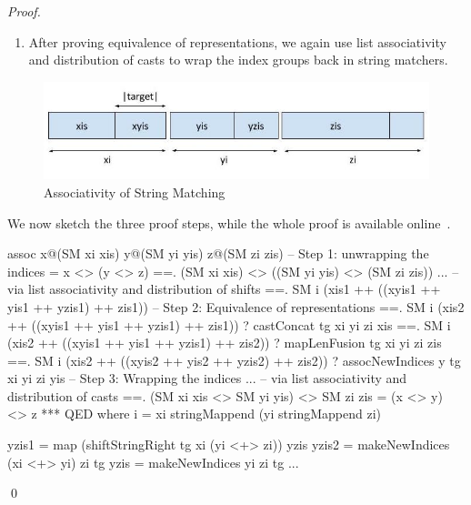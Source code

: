 \begin{proof}
\begin{enumerate}
\begin{code}
zis2 = map (shiftStringRight tg (xi stringMappend yi) zi) zis
\end{code}
That is, in right first, the indices of @z@ are first shifted
by the length of @yi@ and then by the length of @xi@,
while in the left first case, the indices of @z@ are shifted by the
length of @xi stringMappend yi@.
In this second step of the proof we prove, using lemmata,
the equivalence of the different group representations.
%
The most interesting lemma we use is called @assocNewIndices@ and proves
equivalence of all the three middle groups together
by case analysis on the relative lengths of the target @tg@ and the middle string @yi@.
\item After proving equivalence of representations,
we again use list associativity and distribution of casts to wrap the
index groups back in string matchers.
\end{enumerate}
\begin{figure}
\includegraphics[scale=0.5]{AssociativeIndices}
\caption{Associativity of String Matching}
\label{fig:mappend:assoc}
\end{figure}
We now sketch the three proof steps, while the whole proof
is available online~\cite{implementation}.
\begin{code}
assoc x@(SM xi xis) y@(SM yi yis) z@(SM zi zis)
  -- Step 1: unwrapping the indices
  =   x <> (y <> z)
  ==. (SM xi xis) <> ((SM yi yis) <> (SM zi zis))
                         ...
  -- via list associativity and distribution of shifts
  ==. SM i (xis1 ++ ((xyis1 ++ yis1 ++ yzis1) ++ zis1))
  -- Step 2: Equivalence of representations
  ==. SM i (xis2 ++ ((xyis1 ++ yis1 ++ yzis1) ++ zis1))
      ? castConcat tg xi yi zi xis
  ==. SM i (xis2 ++ ((xyis1 ++ yis1 ++ yzis1) ++ zis2))
      ? mapLenFusion tg xi yi zi zis
  ==. SM i (xis2 ++ ((xyis2 ++ yis2 ++ yzis2) ++ zis2))
      ? assocNewIndices y tg xi yi zi yis
  -- Step 3: Wrapping the indices
                         ...
  -- via list associativity and distribution of casts
  ==. (SM xi xis <> SM yi yis) <> SM zi zis
  =   (x <> y) <> z
  *** QED
  where
    i     = xi stringMappend (yi stringMappend zi)

    yzis1 = map (shiftStringRight tg xi (yi <+> zi)) yzis
    yzis2 = makeNewIndices (xi <+> yi) zi tg
    yzis  = makeNewIndices yi zi tg
    ...
\end{code}
\qed\end{proof}
